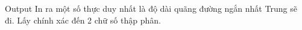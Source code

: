 Output
In ra một số thực duy nhất là độ dài quãng đường ngắn nhất Trung sẽ đi. Lấy chính xác đến 2 chữ số thập phân.